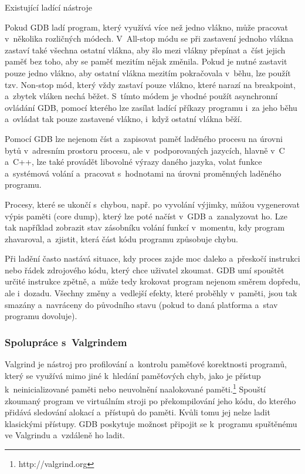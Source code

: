 \documentclass[czech,bachelor,male,python,dept460,hidelinks]{diploma}						%
\newcommand{\parspace}[1][]{
	\ifthenelse{\isempty{#1}}{\vspace{0mm}}{\vspace{#1}}
	\par
}
\begin{document}
\begin{section}{Existující ladící nástroje}
		\parspace Pokud GDB ladí program, který využívá více než jedno vlákno, může pracovat v~několika rozličných módech. \cite{gdb-multithreading}
		V~All-stop módu se při zastavení jednoho vlákna zastaví také všechna ostatní vlákna, aby šlo mezi vlákny přepínat a~číst jejich paměť bez toho,
		aby se paměť mezitím nějak změnila. Pokud je nutné zastavit pouze jedno vlákno, aby ostatní vlákna mezitím pokračovala v~běhu, lze použít tzv. Non-stop mód,
		který vždy zastaví pouze vlákno, které narazí na breakpoint, a~zbytek vláken nechá běžet. S~tímto módem je vhodné použít asynchronní ovládání GDB,
		pomocí kterého lze zasílat ladící příkazy programu i~za jeho běhu a~ovládat tak pouze zastavené vlákno, i~když ostatní vlákna běží.
		
		\parspace Pomocí GDB lze nejenom číst a~zapisovat paměť laděného procesu na úrovni bytů v~adresním prostoru procesu, ale v~podporovaných jazycích, hlavně
		v~C a~C++, lze také provádět libovolné výrazy daného jazyka, volat funkce a~systémová volání a~pracovat s~hodnotami na úrovni proměnných
		laděného programu.
		
		\parspace Procesy, které se ukončí s~chybou, např. po vyvolání výjimky, můžou vygenerovat výpis paměti (core dump), který lze poté načíst v~GDB
		a~zanalyzovat ho. Lze tak například zobrazit stav zásobníku volání funkcí v~momentu, kdy program zhavaroval, a~zjistit, která část kódu programu
		způsobuje chybu.
		
		\parspace Při ladění často nastává situace, kdy proces zajde moc daleko a~přeskočí instrukci nebo řádek zdrojového kódu, který chce uživatel zkoumat.
		GDB umí spouštět určité instrukce zpětně, a~může tedy krokovat program nejenom směrem dopředu, ale i~dozadu.
		Všechny změny a~vedlejší efekty, které proběhly v~paměti, jsou tak smazány a~navráceny do původního stavu (pokud to daná platforma a~stav programu dovoluje).
			
		\subsubsection{Spolupráce s~Valgrindem}
			Valgrind je nástroj pro profilování a~kontrolu paměťové korektnosti programů, který se využívá mimo jiné k~hledání paměťových chyb, jako je přístup
			k~neinicializované paměti nebo neuvolnění naalokované paměti.\footnote{http://valgrind.org}
			Spouští zkoumaný program ve virtuálním stroji po překompilování jeho kódu, do kterého přidává sledování alokací a~přístupů do paměti.
			Kvůli tomu jej nelze ladit klasickými přístupy. GDB poskytuje možnost připojit se k~programu spuštěnému ve Valgrindu a~vzdáleně ho ladit.

\end{section}
\end{document}
